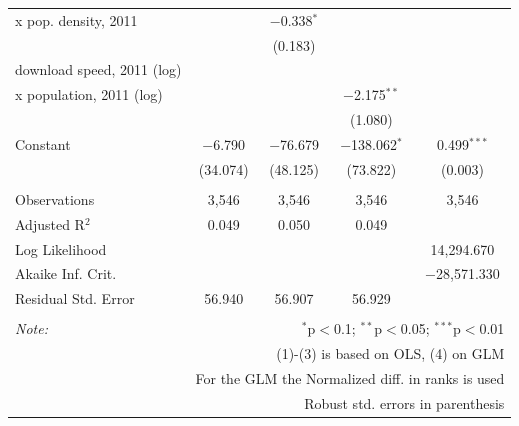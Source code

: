 \documentclass[10pt,letterpaper]{article}
\begin{document}
\begin{table}[!htbp]
\begin{tabular}{@{\extracolsep{1pt}}lcccc}
                             x pop. density, 2011 &  & $-$0.338$^{*}$ &  &  \\ 
  &  & (0.183) &  &  \\ 
  download speed, 2011 (log) \\
                             x population, 2011 (log) &  &  & $-$2.175$^{**}$ &  \\ 
  &  &  & (1.080) &  \\ 
  Constant & $-$6.790 & $-$76.679 & $-$138.062$^{*}$ & 0.499$^{***}$ \\ 
  & (34.074) & (48.125) & (73.822) & (0.003) \\ 
 \hline \\[-1.8ex] 
Observations & 3,546 & 3,546 & 3,546 & 3,546 \\ 
Adjusted R$^{2}$ & 0.049 & 0.050 & 0.049 &  \\ 
Log Likelihood &  &  &  & 14,294.670 \\ 
Akaike Inf. Crit. &  &  &  & $-$28,571.330 \\ 
Residual Std. Error & 56.940 & 56.907 & 56.929 &  \\ 
\hline 
\hline \\[-1.8ex] 
\textit{Note:}  & \multicolumn{4}{r}{$^{*}$p$<$0.1; $^{**}$p$<$0.05; $^{***}$p$<$0.01} \\ 
 & \multicolumn{4}{r}{(1)-(3) is based on OLS, (4) on GLM} \\ 
 & \multicolumn{4}{r}{For the GLM the Normalized diff. in ranks is used} \\ 
 & \multicolumn{4}{r}{Robust std. errors in parenthesis} \\ 
\end{tabular} 
\end{table}
\end{document}
